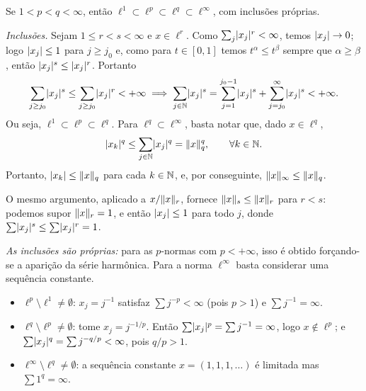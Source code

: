 \begin{exercicio}{Se $1<p<q<\infty$, então $\ell^1\subset \ell^p\subset \ell^q\subset \ell^\infty$, com inclusões próprias.}

  \emph{Inclusões.} Sejam $1\le r<s<\infty$ e $x\in \ell^r$. Como $\sum_j\lvert x_j\rvert^r<\infty$, temos $\lvert x_j\rvert\to0$; logo $\lvert x_j\rvert\le 1$ para $j\ge j_0$ e, como para $t \in [0, 1]$ temos $t^\alpha \le t^\beta$ sempre que $\alpha \ge \beta$,
  então $\lvert x_j\rvert^s\le\lvert x_j\rvert^r$. Portanto
  \begin{align*}
    \sum_{j\ge j_0}\lvert x_j\rvert^s\le \sum_{j\ge j_0}\lvert x_j\rvert^r<+ \infty 
    \implies \sum_{j \in \mathbb N} \lvert x_j\rvert^s = \sum_{j = 1}^{j_0 - 1} \lvert x_j\rvert^s +\sum_{j= j_0}^\infty\lvert x_j\rvert^s < +\infty. 
  \end{align*}
Ou seja, $\ell^1\subset \ell^p\subset \ell^q$. Para $\ell^q\subset \ell^\infty$, basta notar que, dado $x \in \ell^q$, 
\begin{align*}
  |x_k|^q \le \sum_{j \in \mathbb N} \lvert x_j\rvert^q = \lVert x\rVert_q^q, \quad \quad \forall k \in \mathbb N.
\end{align*}
  Portanto, $\lvert x_k\rvert \le \lVert x\rVert_q$ para cada $k \in \mathbb N$, e, por conseguinte, $\lVert x\rVert_\infty \le \lVert x\rVert_q$.

\begin{obs}
O mesmo argumento, aplicado a $x/\lVert x\rVert_r$, fornece $\lVert x\rVert_s\le\lVert x\rVert_r$ para $r<s$: podemos supor $\lVert x\rVert_r=1$, e então $\lvert x_j\rvert\le1$ para todo $j$, donde $\sum\lvert x_j\rvert^s\le\sum\lvert x_j\rvert^r=1$.
\end{obs}

\emph{As inclusões são próprias:} para as $p$-normas com $p<+\infty$, isso é obtido forçando-se a aparição da série harmônica.
Para a norma $\ell^\infty$ basta considerar uma sequência constante.
\begin{itemize}[leftmargin=*]
\item $\ell^p\setminus \ell^1\neq\emptyset$: $x_j=j^{-1}$ satisfaz $\sum j^{-p}<\infty$ (pois $p>1$) e $\sum j^{-1}=\infty$.
\item $\ell^q\setminus \ell^p\neq\emptyset$: tome $x_j=j^{-1/p}$. Então $\sum\lvert x_j\rvert^p=\sum j^{-1}=\infty$, logo $x\notin \ell^p$; e $\sum\lvert x_j\rvert^q=\sum j^{-q/p}<\infty$, pois $q/p>1$.
\item $\ell^\infty\setminus \ell^q\neq\emptyset$: a sequência constante $x=(1,1,1,\dots)$ é limitada mas $\sum 1^q=\infty$.
\end{itemize}
\end{exercicio}


